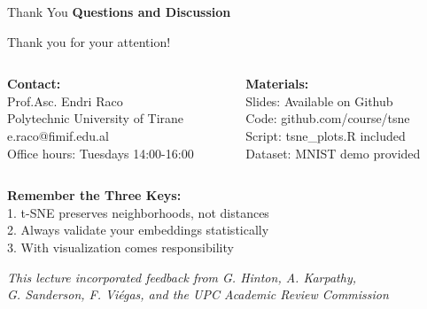 \documentclass[10pt]{beamer}
\newcommand{\emphtext}[1]{\textcolor{upcblue}{\textbf{#1}}}
\begin{document}
\begin{frame}{Thank You}
\emphtext{Questions and Discussion}

\vspace{0.5cm}
\begin{center}
\Large Thank you for your attention!
\end{center}

\vspace{0.5cm}
\begin{columns}[T]
\begin{column}{0.48\textwidth}
\textbf{Contact:}\\
\footnotesize
Prof.Asc. Endri Raco\\
Polytechnic University of Tirane\\
e.raco@fimif.edu.al\\
Office hours: Tuesdays 14:00-16:00
\end{column}

\begin{column}{0.48\textwidth}
\textbf{Materials:}\\
\footnotesize
Slides: Available on Github\\
Code: github.com/course/tsne\\
Script: tsne\_plots.R included\\
Dataset: MNIST demo provided
\end{column}
\end{columns}

\vspace{0.5cm}
\begin{center}
\colorbox{upcblue!10}{
\begin{minipage}{0.85\textwidth}
\centering
\textbf{Remember the Three Keys:}\\
\footnotesize
1. t-SNE preserves neighborhoods, not distances\\
2. Always validate your embeddings statistically\\
3. With visualization comes responsibility
\end{minipage}
}
\end{center}



\vspace{0.3cm}
\begin{center}
\footnotesize
\textit{This lecture incorporated feedback from G. Hinton, A. Karpathy,}\\
\textit{G. Sanderson, F. Viégas, and the UPC Academic Review Commission}
\end{center}
\end{frame}
\end{document}
